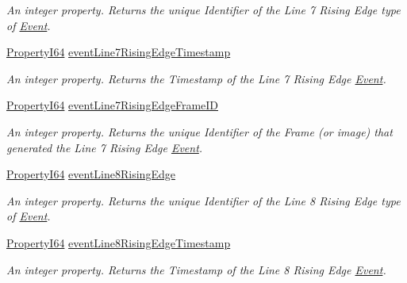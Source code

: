 \begin{DoxyCompactItemize}
\begin{DoxyCompactList}\small\item\em An integer property. Returns the unique Identifier of the Line 7 Rising Edge type of \hyperlink{classmv_i_m_p_a_c_t_1_1acquire_1_1_event}{Event}. \end{DoxyCompactList}\item 
\hyperlink{group___common_interface_ga81749b2696755513663492664a18a893}{Property\+I64} \hyperlink{classmv_i_m_p_a_c_t_1_1acquire_1_1_gen_i_cam_1_1_event_control_a38d382452b1e1050943e527fd87769ea}{event\+Line7\+Rising\+Edge\+Timestamp}
\begin{DoxyCompactList}\small\item\em An integer property. Returns the Timestamp of the Line 7 Rising Edge \hyperlink{classmv_i_m_p_a_c_t_1_1acquire_1_1_event}{Event}. \end{DoxyCompactList}\item 
\hyperlink{group___common_interface_ga81749b2696755513663492664a18a893}{Property\+I64} \hyperlink{classmv_i_m_p_a_c_t_1_1acquire_1_1_gen_i_cam_1_1_event_control_ad8290c93a720b70d441eb4511a950ac0}{event\+Line7\+Rising\+Edge\+Frame\+I\+D}
\begin{DoxyCompactList}\small\item\em An integer property. Returns the unique Identifier of the Frame (or image) that generated the Line 7 Rising Edge \hyperlink{classmv_i_m_p_a_c_t_1_1acquire_1_1_event}{Event}. \end{DoxyCompactList}\item 
\hyperlink{group___common_interface_ga81749b2696755513663492664a18a893}{Property\+I64} \hyperlink{classmv_i_m_p_a_c_t_1_1acquire_1_1_gen_i_cam_1_1_event_control_ae88b5ca4c06470342c7b472b970aca06}{event\+Line8\+Rising\+Edge}
\begin{DoxyCompactList}\small\item\em An integer property. Returns the unique Identifier of the Line 8 Rising Edge type of \hyperlink{classmv_i_m_p_a_c_t_1_1acquire_1_1_event}{Event}. \end{DoxyCompactList}\item 
\hyperlink{group___common_interface_ga81749b2696755513663492664a18a893}{Property\+I64} \hyperlink{classmv_i_m_p_a_c_t_1_1acquire_1_1_gen_i_cam_1_1_event_control_ae6b173783ceb3cb579bab3a7d09cd241}{event\+Line8\+Rising\+Edge\+Timestamp}
\begin{DoxyCompactList}\small\item\em An integer property. Returns the Timestamp of the Line 8 Rising Edge \hyperlink{classmv_i_m_p_a_c_t_1_1acquire_1_1_event}{Event}. \end{DoxyCompactList}\item 

\end{DoxyCompactItemize}
